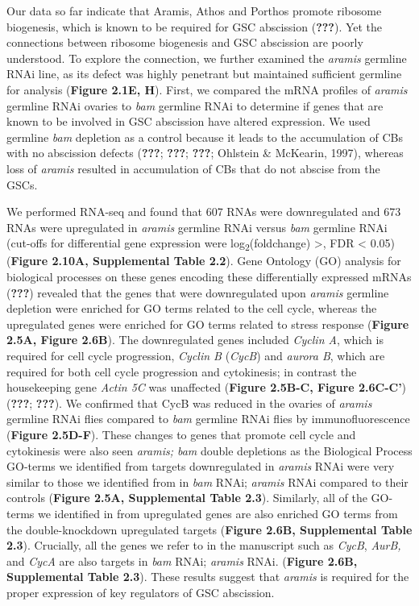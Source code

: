\documentclass[12pt,oneside]{reedthesis}
\begin{document}
Our data so far indicate that Aramis, Athos and Porthos promote ribosome biogenesis, which is known to be required for GSC abscission ({\textbf{???}}). Yet the connections between ribosome biogenesis and GSC abscission are poorly understood. To explore the connection, we further examined the \emph{aramis} germline RNAi line, as its defect was highly penetrant but maintained sufficient germline for analysis (\textbf{Figure 2.1E, H}). First, we compared the mRNA profiles of \emph{aramis} germline RNAi ovaries to \emph{bam} germline RNAi to determine if genes that are known to be involved in GSC abscission have altered expression. We used germline \emph{bam} depletion as a control because it leads to the accumulation of CBs with no abscission defects ({\textbf{???}}; {\textbf{???}}; {\textbf{???}}; Ohlstein \& McKearin, 1997), whereas loss of \emph{aramis} resulted in accumulation of CBs that do not abscise from the GSCs.

We performed RNA-seq and found that 607 RNAs were downregulated and 673 RNAs were upregulated in \emph{aramis} germline RNAi versus \emph{bam} germline RNAi (cut-offs for differential gene expression were log\textsubscript{2}(foldchange) \textgreater{}\textbar, FDR \textless{} 0.05) (\textbf{Figure 2.10A, Supplemental Table 2.2}). Gene Ontology (GO) analysis for biological processes on these genes encoding these differentially expressed mRNAs ({\textbf{???}}) revealed that the genes that were downregulated upon \emph{aramis} germline depletion were enriched for GO terms related to the cell cycle, whereas the upregulated genes were enriched for GO terms related to stress response (\textbf{Figure 2.5A, Figure 2.6B}). The downregulated genes included \emph{Cyclin A}, which is required for cell cycle progression, \emph{Cyclin B} (\emph{CycB}) and \emph{aurora B}, which are required for both cell cycle progression and cytokinesis; in contrast the housekeeping gene \emph{Actin 5C} was unaffected (\textbf{Figure 2.5B-C, Figure 2.6C-C'}) ({\textbf{???}}; {\textbf{???}}). We confirmed that CycB was reduced in the ovaries of \emph{aramis} germline RNAi flies compared to \emph{bam} germline RNAi flies by immunofluorescence (\textbf{Figure 2.5D-F}). These changes to genes that promote cell cycle and cytokinesis were also seen \emph{aramis; bam} double depletions as the Biological Process GO-terms we identified from targets downregulated in \emph{aramis} RNAi were very similar to those we identified from in \emph{bam} RNAi; \emph{aramis} RNAi compared to their controls (\textbf{Figure 2.5A, Supplemental Table 2.3}). Similarly, all of the GO-terms we identified in from upregulated genes are also enriched GO terms from the double-knockdown upregulated targets (\textbf{Figure 2.6B, Supplemental Table 2.3}). Crucially, all the genes we refer to in the manuscript such as \emph{CycB}, \emph{AurB,} and \emph{CycA} are also targets in \emph{bam} RNAi; \emph{aramis} RNAi. (\textbf{Figure 2.6B, Supplemental Table 2.3}). These results suggest that \emph{aramis} is required for the proper expression of key regulators of GSC abscission.
\end{document}
